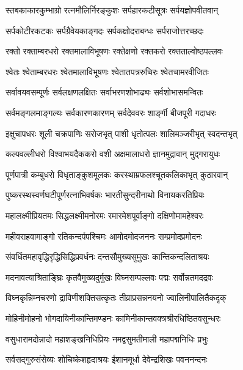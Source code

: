\twolineshloka
{स्तबकाकारकुम्भाग्रो रत्नमौलिर्निरङ्कुशः}
{सर्पहारकटीसूत्रः सर्पयज्ञोपवीतवान्}%

\twolineshloka
{सर्पकोटीरकटकः सर्पग्रैवेयकाङ्गदः}
{सर्पकक्षोदराबन्धः सर्पराजोत्तरच्छदः}%

\twolineshloka
{रक्तो रक्ताम्बरधरो रक्तमालाविभूषणः}
{रक्तेक्षणो रक्तकरो रक्तताल्वोष्ठपल्लवः}%

\twolineshloka
{श्वेतः श्वेताम्बरधरः श्वेतमालाविभूषणः}
{श्वेतातपत्ररुचिरः श्वेतचामरवीजितः}%

\twolineshloka
{सर्वावयवसम्पूर्णः सर्वलक्षणलक्षितः}
{सर्वाभरणशोभाढ्यः सर्वशोभासमन्वितः}%

\twolineshloka
{सर्वमङ्गलमाङ्गल्यः सर्वकारणकारणम्}
{सर्वदेववरः शार्ङ्गी बीजपूरी गदाधरः}%


\twolineshloka
{इक्षुचापधरः शूली चक्रपाणिः सरोजभृत्}
{पाशी धृतोत्पलः शालिमञ्जरीभृत् स्वदन्तभृत्}%

\twolineshloka
{कल्पवल्लीधरो विश्वाभयदैककरो वशी}
{अक्षमालाधरो ज्ञानमुद्रावान् मुद्गरायुधः}%

\twolineshloka
{पूर्णपात्री कम्बुधरो विधृताङ्कुशमूलकः}
{करस्थाम्रफलश्चूतकलिकाभृत् कुठारवान्}%

\twolineshloka
{पुष्करस्थस्वर्णघटीपूर्णरत्नाभिवर्षकः}
{भारतीसुन्दरीनाथो विनायकरतिप्रियः}%

\twolineshloka
{महालक्ष्मीप्रियतमः सिद्धलक्ष्मीमनोरमः}
{रमारमेशपूर्वाङ्गो दक्षिणोमामहेश्वरः}%

\twolineshloka
{महीवराहवामाङ्गो रतिकन्दर्पपश्चिमः}
{आमोदमोदजननः सम्प्रमोदप्रमोदनः}%

\twolineshloka
{संवर्धितमहावृद्धिरृद्धिसिद्धिप्रवर्धनः}
{दन्तसौमुख्यसुमुखः कान्तिकन्दलिताश्रयः}%

\twolineshloka
{मदनावत्याश्रिताङ्घ्रिः कृतवैमुख्यदुर्मुखः}
{विघ्नसम्पल्लवः पद्मः सर्वोन्नतमदद्रवः}%

\twolineshloka
{विघ्नकृन्निम्नचरणो द्राविणीशक्तिसत्कृतः}
{तीव्राप्रसन्ननयनो ज्वालिनीपालितैकदृक्}%

\twolineshloka
{मोहिनीमोहनो भोगदायिनीकान्तिमण्डनः}
{कामिनीकान्तवक्त्रश्रीरधिष्ठितवसुन्धरः}%

\twolineshloka
{वसुधारामदोन्नादो महाशङ्खनिधिप्रियः}
{नमद्वसुमतीमाली महापद्मनिधिः प्रभुः}%

\twolineshloka
{सर्वसद्गुरुसंसेव्यः शोचिष्केशहृदाश्रयः}
{ईशानमूर्धा देवेन्द्रशिखः पवननन्दनः}%

